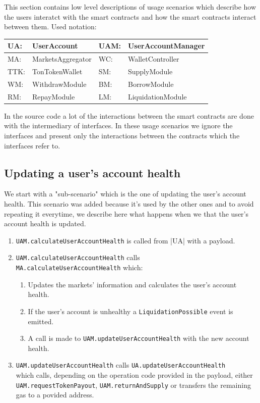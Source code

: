 This section contains low level descriptions of usage scenarios which describe how the users interatct with the smart contracts and how the smart contracts interact between them.
\newpage
Used notation:

\begin{tabularx}{\textwidth}{|l X|l X|} \hline
  UA: & UserAccount &         UAM: & UserAccountManager \\\hline
  MA: & MarketsAggregator &   WC: & WalletController \\\hline
  TTK: & TonTokenWallet &     SM: & SupplyModule \\\hline
  WM: & WithdrawModule &      BM: & BorrowModule \\\hline
  RM: & RepayModule &         LM: & LiquidationModule \\\hline
\end{tabularx}

In the source code a lot of the interactions between the smart contracts are done with the intermediary of interfaces. In these usage scenarios we ignore the interfaces and present only the interactions between the contracts which the interfaces refer to.

\subsection{Updating a user's account health}
We start with a "sub-scenario" which is the one of updating the user's account health. This scenario was added because it's used by the other ones and to avoid repeating it everytime, we describe here what happens when we that the user's account health is updated.

\begin{enumerate}
  \item \verb|UAM.calculateUserAccountHealth| is called from |UA| with a payload.
  \item \verb|UAM.calculateUserAccountHealth| calls \\\verb|MA.calculateUserAccountHealth| which:
  \begin{enumerate}[label*=\arabic*.]
    \item Updates the markets' information and calculates the user's account health.
    \item If the user's account is unhealthy a \verb|LiquidationPossible| event is emitted.
    \item A call is made to \verb|UAM.updateUserAccountHealth| with the new account health.
  \end{enumerate}
  \item \verb|UAM.updateUserAccountHealth| calls \verb|UA.updateUserAccountHealth| \\which calls, depending on the operation code provided in the payload, either \verb|UAM.requestTokenPayout|, \verb|UAM.returnAndSupply| or transfers the remaining gas to a povided address.
\end{enumerate}

